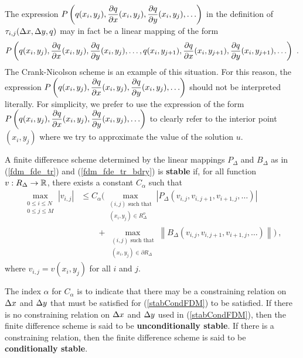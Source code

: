 \begin{rmk}[Warning]
The expression
$\displaystyle P\left(q(x_i,y_j), \frac{\partial{q}}{\partial{x}}(x_i,y_j), \frac{\partial{q}}{\partial{y}}(x_i,y_j),
\ldots \right)$ in the definition of
$\displaystyle \tau_{i,j}(\Delta{x},\Delta{y},q)$ may in fact be
a linear mapping of the form
\[
  P\left(q(x_i,y_j), \frac{\partial{q}}{\partial{x}}(x_i,y_j), \frac{\partial{q}}{\partial{y}}(x_i,y_j),
\ldots, q(x_i,y_{j+1}), \frac{\partial{q}}{\partial{x}}(x_i,y_{j+1}),
\frac{\partial{q}}{\partial{y}}(x_i,y_{j+1}), \ldots \right) \ .
\]
The Crank-Nicolson scheme is an example of this situation.
For this reason, the expression
$\displaystyle P\left(q(x_i,y_j), \frac{\partial{q}}{\partial{x}}(x_i,y_j), \frac{\partial{q}}{\partial{y}}(x_i,y_j),
\ldots \right)$ should not be interpreted literally.
For simplicity, we prefer to use the expression of the form
$\displaystyle P\left(q(x_i,y_j), \frac{\partial{q}}{\partial{x}}(x_i,y_j), \frac{\partial{q}}{\partial{y}}(x_i,y_j),
\ldots \right)$ to clearly refer to the interior point $(x_i,y_j)$ 
where we try to approximate the value of the solution $u$.
\end{rmk}

\begin{defn}\label{fdmStableDefNo1}
A finite difference scheme determined by the linear mappings
$P_\Delta$ and $B_\Delta$ as in (\ref{fdm_fde_tr}) and
(\ref{fdm_fde_tr_bdry}) is
{\bfseries stable} if,
for all function $v: R_\Delta \to \mathbb{R}$, there exists
a constant $C_\alpha$ such that
\begin{equation} \label{stabCondFDM}
\begin{split}
\max_{\substack{0\leq i\leq N\\0\leq j \leq M}} |v_{i,j}| &\leq
C_\alpha \bigg(
\max_{\substack{(i,j) \text{ such that}\\(x_i,y_j)\in R^o_\Delta}}
\left| P_\Delta\left(v_{i,j}, v_{i,j+1}, v_{i+1,j},\ldots\right) \right| \\
&\qquad
+ \max_{\substack{(i,j) \text{ such that}\\ (x_i,y_j)\in \partial R_\Delta}}
\left\| B_\Delta\left(v_{i,j},v_{i,j+1},v_{i+1,j}, \ldots\right) \right\|
\bigg) \ ,
\end{split}
\end{equation}
where $v_{i,j} = v(x_i,y_j)$ for all $i$ and $j$.

The index $\alpha$ for $C_\alpha$ is to indicate that there may be a
constraining relation on $\Delta{x}$ and $\Delta{y}$ that must be
satisfied for (\ref{stabCondFDM}) to be satisfied.  If there is no
constraining relation on $\Delta{x}$ and $\Delta{y}$ used in
(\ref{stabCondFDM}), then the finite difference scheme is said to be
{\bfseries unconditionally stable}.
If there is a constraining relation, then the finite difference scheme
is said to be {\bfseries conditionally stable}.
\end{defn}

